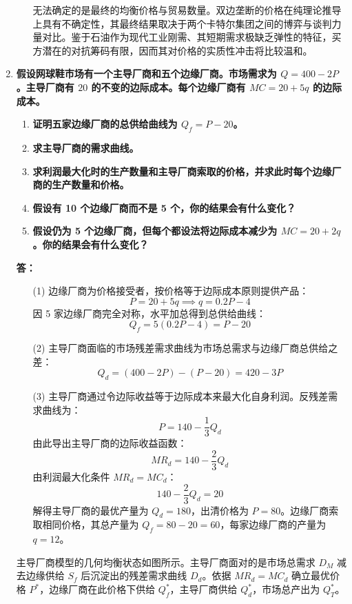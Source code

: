 \begin{enumerate}[label=\textbf{\arabic*.}, leftmargin=*]
\begin{enumerate}
			无法确定的是最终的均衡价格与贸易数量。双边垄断的价格在纯理论推导上具有不确定性，其最终结果取决于两个卡特尔集团之间的博弈与谈判力量对比。鉴于石油作为现代工业刚需、其短期需求极缺乏弹性的特征，买方潜在的对抗筹码有限，因而其对价格的实质性冲击将比较温和。
		\end{enumerate}
		\newpage
		\item \textbf{假设网球鞋市场有一个主导厂商和五个边缘厂商。市场需求为 $Q = 400 - 2P$。主导厂商有 $20$ 的不变的边际成本。每个边缘厂商有 $MC = 20 + 5q$ 的边际成本。}
		
		\begin{enumerate}
			\item \textbf{证明五家边缘厂商的总供给曲线为 $Q_f = P - 20$。}
			\item \textbf{求主导厂商的需求曲线。}
			\item \textbf{求利润最大化时的生产数量和主导厂商索取的价格，并求此时每个边缘厂商的生产数量和价格。}
			\item \textbf{假设有 10 个边缘厂商而不是 5 个，你的结果会有什么变化？}
			\item \textbf{假设仍为 5 个边缘厂商，但每个都设法将边际成本减少为 $MC = 20 + 2q$。你的结果会有什么变化？}
		\end{enumerate}
		
		\textbf{答：}
		\begin{enumerate}
			\item[(1)] 边缘厂商为价格接受者，按价格等于边际成本原则提供产品：
			\[ P = 20 + 5q \implies q = 0.2P - 4 \]
			因 5 家边缘厂商完全对称，水平加总得到总供给曲线：
			\[ Q_f = 5(0.2P - 4) = P - 20 \]
			
			\item[(2)] 主导厂商面临的市场残差需求曲线为市场总需求与边缘厂商总供给之差：
			\[ Q_d = (400 - 2P) - (P - 20) = 420 - 3P \]
			
			\item[(3)] 主导厂商通过令边际收益等于边际成本来最大化自身利润。反残差需求曲线为：
			\[ P = 140 - \frac{1}{3}Q_d \]
			由此导出主导厂商的边际收益函数：
			\[ MR_d = 140 - \frac{2}{3}Q_d \]
			由利润最大化条件 $MR_d = MC_d$：
			\[ 140 - \frac{2}{3}Q_d = 20 \]
			解得主导厂商的最优产量为 $Q_d = 180$，出清价格为 $P = 80$。边缘厂商索取相同价格，其总产量为 $Q_f = 80 - 20 = 60$，每家边缘厂商的产量为 $q = 12$。
		\end{enumerate}
		
		\newpage
		主导厂商模型的几何均衡状态如图所示。主导厂商面对的是市场总需求 $D_M$ 减去边缘供给 $S_f$ 后沉淀出的残差需求曲线 $D_d$。依据 $MR_d = MC_d$ 确立最优价格 $P^*$，边缘厂商在此价格下供给 $Q_f^*$，主导厂商供给 $Q_d^*$，市场总产出为 $Q_T^*$。
		

\end{enumerate}
